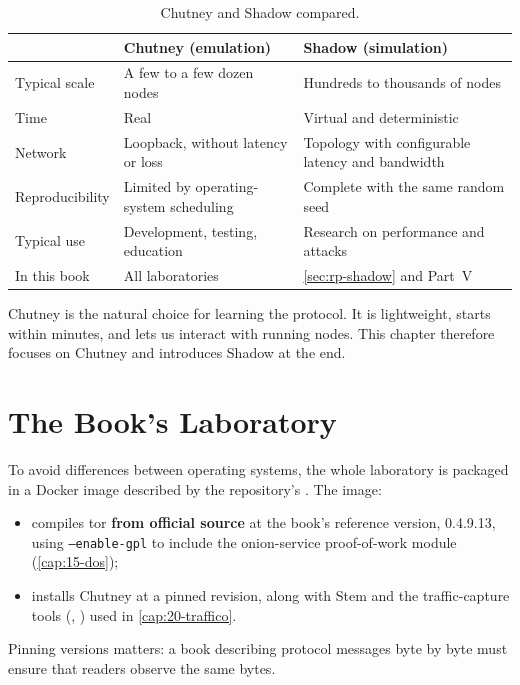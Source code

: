 \begin{table}[htbp]
\centering\small
\begin{tabularx}{\textwidth}{@{}l>{\raggedright\arraybackslash}X>{\raggedright\arraybackslash}X@{}}
\toprule
 & Chutney (emulation) & Shadow (simulation) \\
\midrule
Typical scale & A few to a few dozen nodes & Hundreds to thousands of nodes \\
Time & Real & Virtual and deterministic \\
Network & Loopback, without latency or loss & Topology with configurable latency and bandwidth \\
Reproducibility & Limited by operating-system scheduling & Complete with the same random seed \\
Typical use & Development, testing, education & Research on performance and attacks \\
In this book & All laboratories & \cref{sec:rp-shadow} and Part~V \\
\bottomrule
\end{tabularx}
\caption{Chutney and Shadow compared.}
\label{tab:chutney-shadow}
\end{table}

Chutney is the natural choice for learning the protocol. It is lightweight, starts within minutes, and lets us interact with running nodes. This chapter therefore focuses on Chutney and introduces Shadow at the end.

\section{The Book's Laboratory}\label{sec:rp-avvio}

To avoid differences between operating systems, the whole laboratory is packaged in a Docker image described by the repository's . The image:
\begin{itemize}
  \item compiles tor \textbf{from official source} at the book's reference version, 0.4.9.13, using \texttt{--enable-gpl} to include the onion-service proof-of-work module (\cref{cap:15-dos});
  \item installs Chutney at a pinned revision, along with Stem and the traffic-capture tools (, ) used in \cref{cap:20-traffico}.
\end{itemize}
Pinning versions matters: a book describing protocol messages byte by byte must ensure that readers observe the same bytes.


